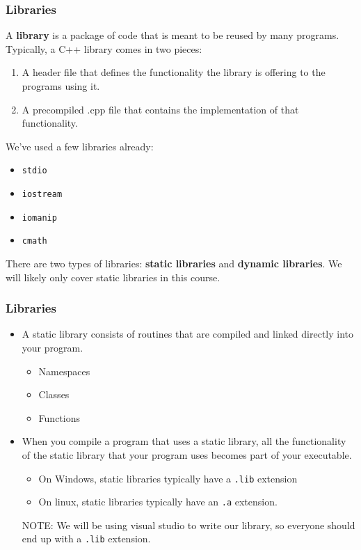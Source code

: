 \documentclass{if-beamer}
\begin{document}
\begin{frame}
	\frametitle{Libraries}
	
	A \textbf{library} is a package of code that is meant to be reused by many programs. Typically, a C++ library comes in two pieces: \\\vspace{0.2cm}
	\begin{enumerate}
		\item A header file that defines the functionality the library is offering to the programs using it.
		\item A precompiled .cpp file that contains the implementation of that functionality.\\\vspace{0.2cm}
	\end{enumerate}
	We've used a few libraries already:\\\vspace{0.2cm}
	\begin{itemize}
		\item \texttt{stdio}
		\item \texttt{iostream}
		\item \texttt{iomanip}
		\item \texttt{cmath} \\\vspace{0.2cm}
	\end{itemize}
	There are two types of libraries: \textbf{static libraries} and \textbf{dynamic libraries}.	We will likely only cover static libraries in this course.
\end{frame}

\begin{frame}
	\frametitle{Libraries}
	\begin{itemize}
		\item A static library consists of routines that are compiled and linked directly into your program. \\\vspace{0.2cm}
		\begin{itemize}
			\item Namespaces
			\item Classes
			\item Functions
		\end{itemize}
		\item When you compile a program that uses a static library, all the functionality of the static library that your program uses becomes part of your executable.\\\vspace{0.2cm}
		\begin{itemize}
			\item On Windows, static libraries typically have a \texttt{.lib} extension
			\item On linux, static libraries typically have an \texttt{.a} extension.\\\vspace{0.2cm}
		\end{itemize}
		NOTE: We will be using visual studio to write our library, so everyone should end up with a \texttt{.lib} extension. 
	\end{itemize}	
\end{frame}
\end{document}
